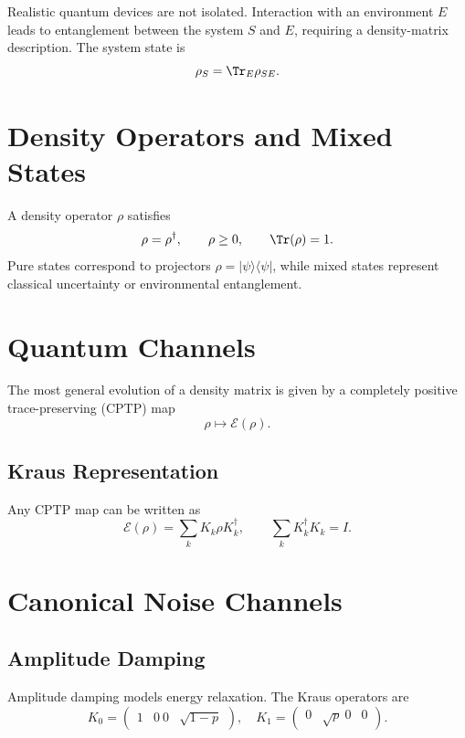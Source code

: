 \documentclass{book}
\begin{document}
Realistic quantum devices are not isolated. Interaction with an environment $E$ leads to entanglement between the system $S$ and $E$, requiring a density-matrix description. The system state is
\begin{equation}
\rho_S = \Tr_E \rho_{SE}.
\end{equation}

\section{Density Operators and Mixed States}

A density operator $\rho$ satisfies
\begin{equation}
\rho = \rho^\dagger, \qquad \rho \ge 0, \qquad \Tr(\rho)=1.
\end{equation}
Pure states correspond to projectors $\rho=|\psi\rangle\langle\psi|$, while mixed states represent classical uncertainty or environmental entanglement.

\section{Quantum Channels}

The most general evolution of a density matrix is given by a completely positive trace-preserving (CPTP) map
\begin{equation}
\rho \mapsto \mathcal{E}(\rho).
\end{equation}

\subsection{Kraus Representation}

Any CPTP map can be written as
\begin{equation}
\mathcal{E}(\rho) = \sum_k K_k \rho K_k^\dagger, \qquad \sum_k K_k^\dagger K_k = I.
\end{equation}

\section{Canonical Noise Channels}

\subsection{Amplitude Damping}

Amplitude damping models energy relaxation. The Kraus operators are
\begin{equation}
K_0 = \begin{pmatrix}1 & 0 \ 0 & \sqrt{1-p}\end{pmatrix}, \quad
K_1 = \begin{pmatrix}0 & \sqrt{p} \ 0 & 0\end{pmatrix}.
\end{equation}
\end{document}
